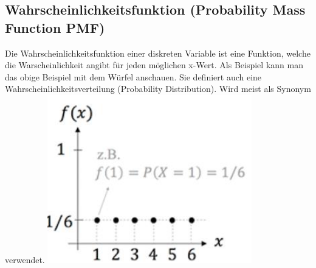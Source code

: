 \subsection{Wahrscheinlichkeitsfunktion (Probability Mass Function PMF)}
Die Wahrscheinlichkeitsfunktion einer diskreten Variable ist eine Funktion, welche die Warscheinlichkeit angibt für jeden möglichen x-Wert. Als Beispiel kann man das obige Beispiel mit dem Würfel anschauen. Sie definiert auch eine Wahrscheinlichkeitsverteilung (Probability Distribution). Wird meist als Synonym verwendet.
\includegraphics[width=\linewidth]{img/pmf.png}

